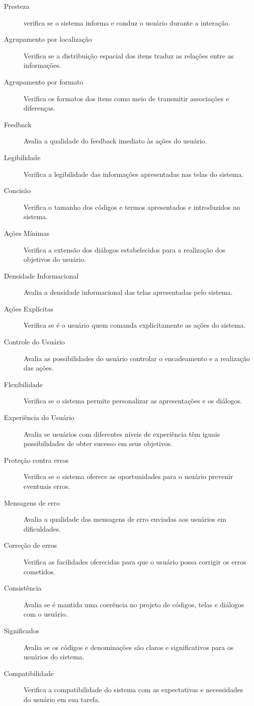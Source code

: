 \begin{description}
\item[Presteza]
verifica se o sistema informa e conduz o usuário durante a interação.
\item[Agrupamento por localização]
Verifica se a distribuição espacial dos itens traduz as relações entre as informações.
\item[Agrupamento por formato]
Verifica os formatos dos itens como meio de transmitir associações e diferenças.
\item[Feedback]
Avalia a qualidade do feedback imediato às ações do usuário.
\item[Legibilidade]
Verifica a legibilidade das informações apresentadas nas telas do sistema.
\item[Concisão]
Verifica o tamanho dos códigos e termos apresentados e introduzidos no sistema.
\item[Ações Mínimas]
Verifica a extensão dos diálogos estabelecidos para a realização dos objetivos do usuário.
\item[Densidade Informacional]
Avalia a densidade informacional das telas apresentadas pelo sistema.
\item[Ações Explícitas]
Verifica se é o usuário quem comanda explicitamente as ações do sistema.
\item[Controle do Usuário]
Avalia as possibilidades do usuário controlar o encadeamento e a realização das ações.
\item[Flexibilidade]
Verifica se o sistema permite personalizar as apresentações e os diálogos.
\item[Experiência do Usuário]
Avalia se usuários com diferentes níveis de experiência têm iguais possibilidades de obter sucesso em seus objetivos.
\item[Proteção contra erros]
Verifica se o sistema oferece as oportunidades para o usuário prevenir eventuais erros.
\item[Mensagens de erro]
Avalia a qualidade das mensagens de erro enviadas aos usuários em dificuldades.
\item[Correção de erros]
Verifica as facilidades oferecidas para que o usuário possa corrigir os erros cometidos.
\item[Consistência]
Avalia se é mantida uma coerência no projeto de códigos, telas e diálogos com o usuário.
\item[Significados]
Avalia se os códigos e denominações são claros e significativos para os usuários do sistema.
\item[Compatibilidade]
Verifica a compatibilidade do sistema com as expectativas e necessidades do usuário em sua tarefa.
\end{description}

